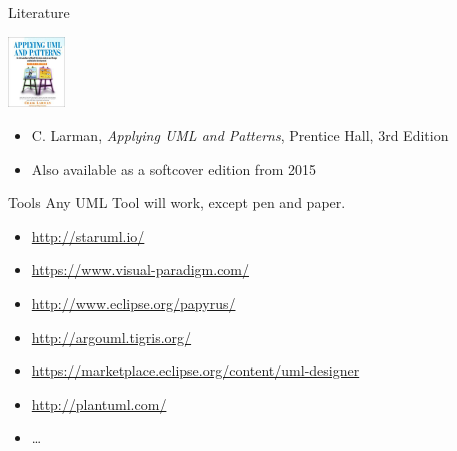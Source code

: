 \documentclass[10pt,t,a4paper]{beamer}
\begin{document}
\begin{frame}[shrink=15,label=sec-6]{Literature}

\includegraphics[width=1.5cm]{./ILarman.jpg}
\begin{itemize}
\item C. Larman, \emph{Applying UML and Patterns}, Prentice Hall, 3rd Edition
\item Also available as a softcover edition from 2015
\end{itemize}

\end{frame}
\begin{frame}[label=sec-7]{Tools}
Any UML Tool will work, except pen and paper.

\begin{itemize}
\item \url{http://staruml.io/}
\item \url{https://www.visual-paradigm.com/}
\item \url{http://www.eclipse.org/papyrus/}
\item \url{http://argouml.tigris.org/}
\item \url{https://marketplace.eclipse.org/content/uml-designer}
\item \url{http://plantuml.com/}
\item \ldots{}
\end{itemize}
\end{frame}
\end{document}
